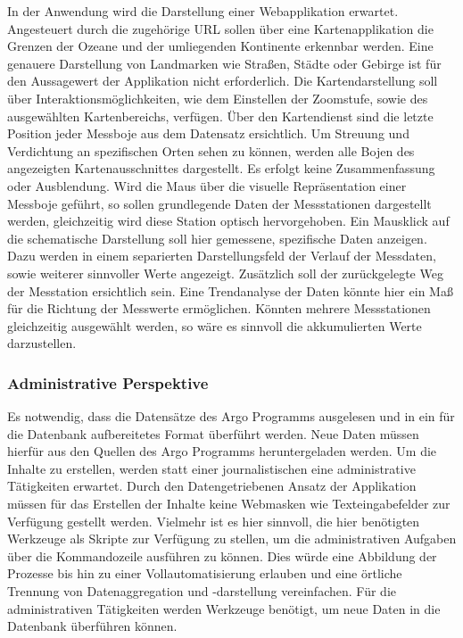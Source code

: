     In der Anwendung wird die Darstellung einer Webapplikation erwartet. Angesteuert durch die zugehörige URL 
    sollen über eine Kartenapplikation die Grenzen der Ozeane und der umliegenden Kontinente erkennbar werden.  Eine genauere Darstellung von Landmarken wie Straßen, Städte oder Gebirge ist für den Aussagewert der Applikation nicht erforderlich. Die Kartendarstellung soll über Interaktionsmöglichkeiten, wie dem Einstellen der Zoomstufe, sowie des ausgewählten Kartenbereichs, verfügen. Über den Kartendienst sind die letzte Position jeder Messboje aus dem Datensatz ersichtlich. Um Streuung und Verdichtung an spezifischen Orten sehen zu können, werden alle Bojen des angezeigten Kartenausschnittes dargestellt. Es erfolgt keine Zusammenfassung oder Ausblendung.
    Wird die Maus über die visuelle Repräsentation einer Messboje geführt, so sollen grundlegende Daten der Messstationen dargestellt werden, gleichzeitig wird diese Station optisch hervorgehoben.
    Ein Mausklick auf die schematische Darstellung soll hier gemessene, spezifische Daten anzeigen. Dazu werden in einem separierten Darstellungsfeld der Verlauf der Messdaten, sowie weiterer sinnvoller Werte angezeigt. Zusätzlich soll der zurückgelegte Weg der Messtation ersichtlich sein.  Eine Trendanalyse der Daten könnte hier ein Maß für die Richtung der Messwerte ermöglichen. Könnten mehrere Messstationen gleichzeitig ausgewählt werden, so wäre es sinnvoll die akkumulierten Werte darzustellen.
    
    \subsubsection{Administrative Perspektive}
    
    Es notwendig, dass die Datensätze des Argo Programms ausgelesen und in ein für die Datenbank aufbereitetes Format überführt werden. Neue Daten müssen hierfür aus den Quellen des Argo Programms heruntergeladen werden. Um die Inhalte zu erstellen, werden statt einer journalistischen eine administrative Tätigkeiten erwartet. Durch den Datengetriebenen Ansatz der Applikation müssen für das Erstellen der Inhalte keine Webmasken wie Texteingabefelder zur Verfügung gestellt werden. Vielmehr ist es hier sinnvoll, die hier benötigten Werkzeuge als Skripte zur Verfügung zu stellen, um die administrativen Aufgaben über die Kommandozeile ausführen zu können. Dies würde eine Abbildung der Prozesse bis hin zu einer Vollautomatisierung erlauben und eine örtliche Trennung von Datenaggregation und -darstellung vereinfachen.
    Für die administrativen Tätigkeiten werden Werkzeuge benötigt, um neue Daten  in die Datenbank überführen können.  
    

